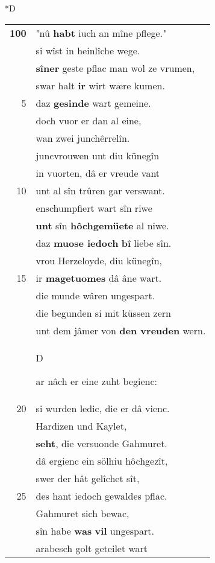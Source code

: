 \documentclass[8pt,a4paper,notitlepage]{article}
\begin{document}
\begin{table}[ht]
\begin{minipage}[t]{0.5\linewidth}
\small
\begin{center}*D
\end{center}
\begin{tabular}{rl}
\textbf{100} & "nû \textbf{habt} iuch an mîne pflege."\\ 
 & si wîst in heinlîche wege.\\ 
 & \textbf{sîner} geste pflac man wol ze vrumen,\\ 
 & swar halt \textbf{ir} wirt wære kumen.\\ 
5 & daz \textbf{gesinde} wart gemeine.\\ 
 & doch vuor er dan al eine,\\ 
 & wan zwei junchêrrelîn.\\ 
 & juncvrouwen unt diu künegîn\\ 
 & in vuorten, dâ er vreude vant\\ 
10 & unt al sîn trûren gar verswant.\\ 
 & enschumpfiert wart sîn riwe\\ 
 & \textbf{unt} sîn \textbf{hôchgemüete} al niwe.\\ 
 & daz \textbf{muose iedoch} \textbf{bî} liebe sîn.\\ 
 & vrou Herzeloyde, diu künegîn,\\ 
15 & ir \textbf{magetuomes} dâ âne wart.\\ 
 & die munde wâren ungespart.\\ 
 & die begunden si mit küssen zern\\ 
 & unt dem jâmer von \textbf{den vreuden} wern.\\ 
 & \begin{large}D\end{large}ar nâch er eine zuht begienc:\\ 
20 & si wurden ledic, die er dâ vienc.\\ 
 & Hardizen und Kaylet,\\ 
 & \textbf{seht}, die versuonde Gahmuret.\\ 
 & dâ ergienc ein sölhiu hôchgezît,\\ 
 & swer der hât gelîchet sît,\\ 
25 & des hant iedoch gewaldes pflac.\\ 
 & Gahmuret sich bewac,\\ 
 & sîn habe \textbf{was} \textbf{vil} ungespart.\\ 
 & arabesch golt geteilet wart\\ 

\end{tabular}
\end{minipage}
\end{table}
\end{document}
